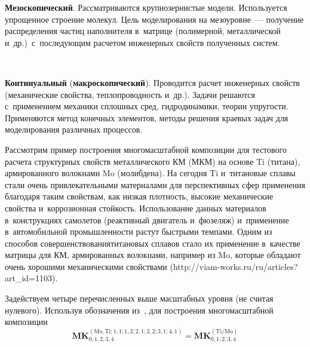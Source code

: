 \begin{multicols}{2}
     \textbf{Мезоскопический}. Рас\-смат\-ри\-ва\-ют\-ся крупнозернистые модели. 
Используется упрощенное строение молекул. Цель моделирования на 
мезоуровне~--- получение распределения час\-тиц \mbox{наполнителя} в~мат\-ри\-це 
(полимерной, металлической и~др.)\ с~по\-сле\-ду\-ющим расчетом инженерных 
свойств полученных сис\-тем. 

\begin{figure*}[b] %
\vspace*{8pt}
  \begin{center}  
    \mbox{%
\epsfxsize=133.618mm
}

\end{center}
\vspace*{-2pt}
\end{figure*}
     
     \textbf{Континуальный} (\textbf{макроскопический}). Проводится расчет 
инженерных свойств (механические свойства, теп\-ло\-про\-вод\-ность и~др.). Задачи 
решаются с~применением механики сплош\-ных сред, гид\-ро\-ди\-на\-ми\-ки, тео\-рии 
упру\-гости. Применяются метод конечных элементов, методы решения краевых 
задач для моделирования различных процессов. 
     
     Рассмотрим пример построения многомасштабной композиции для 
тес\-то\-во\-го рас\-че\-та структурных свойств металлического 
КМ (МКМ) на основе Ti (титана), армированного волокнами Mo 
(молибдена). На сегодня Ti и~титановые сплавы стали очень привлекательными 
материалами для перспективных сфер применения благодаря таким свойствам, 
как низкая плот\-ность, высокие механические свойства и~коррозионная стой\-кость. 
Использование данных материалов в~конструкциях самолетов (реактивный 
двигатель и~фюзеляж) и~применение в~автомобильной про\-мыш\-лен\-ности рас\-тут 
быст\-ры\-ми темпами. Одним из способов совершенствования\linebreak титановых сплавов 
стало их применение в~качестве мат\-ри\-цы для КМ, 
армированных волокнами, например из Mo, которые обладают очень \mbox{хорошими} 
механическими свойствами ({\sf http://\linebreak viam-works.ru/ru/articles?art\_id=1103}). 
     
     Задействуем четыре перечисленных выше масштабных уров\-ня (не считая 
нулевого). Используя обозначения из~\cite{1-ab, 2-ab}, для построения 
многомасштабной композиции 
$$
\mathbf{MK}_{0,1,2,3,4}^{(\mathrm{Mo}, \mathrm{Ti}; 
1{,}1; 1{,}2; 2{,}1; 2{,}2; 3{,}1; 4{,}1)}= \mathbf{MK}_{0,1,2,3,4}^{(\mathrm{Ti/Mo})}
$$ 


\end{multicols}
